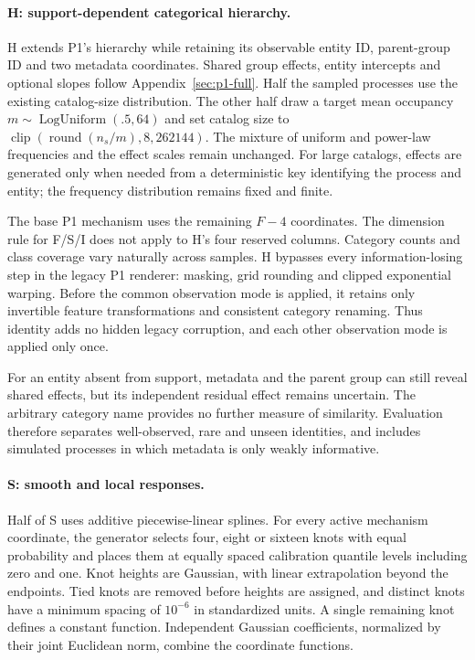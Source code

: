 \documentclass[11pt]{article}
\begin{document}
\paragraph{H: support-dependent categorical hierarchy.}
H extends P1's hierarchy while retaining its observable entity ID, parent-group ID and two metadata coordinates. Shared group effects, entity intercepts and optional slopes follow Appendix~\ref{sec:p1-full}. Half the sampled processes use the existing catalog-size distribution. The other half draw a target mean occupancy $m\sim\operatorname{LogUniform}(.5,64)$ and set catalog size to $\operatorname{clip}(\operatorname{round}(n_s/m),8,262144)$. The mixture of uniform and power-law frequencies and the effect scales remain unchanged. For large catalogs, effects are generated only when needed from a deterministic key identifying the process and entity; the frequency distribution remains fixed and finite.

The base P1 mechanism uses the remaining $F-4$ coordinates. The dimension rule for F/S/I does not apply to H's four reserved columns. Category counts and class coverage vary naturally across samples. H bypasses every information-losing step in the legacy P1 renderer: masking, grid rounding and clipped exponential warping. Before the common observation mode is applied, it retains only invertible feature transformations and consistent category renaming. Thus identity adds no hidden legacy corruption, and each other observation mode is applied only once.

For an entity absent from support, metadata and the parent group can still reveal shared effects, but its independent residual effect remains uncertain. The arbitrary category name provides no further measure of similarity. Evaluation therefore separates well-observed, rare and unseen identities, and includes simulated processes in which metadata is only weakly informative.

\paragraph{S: smooth and local responses.}
Half of S uses additive piecewise-linear splines. For every active mechanism coordinate, the generator selects four, eight or sixteen knots with equal probability and places them at equally spaced calibration quantile levels including zero and one. Knot heights are Gaussian, with linear extrapolation beyond the endpoints. Tied knots are removed before heights are assigned, and distinct knots have a minimum spacing of $10^{-6}$ in standardized units. A single remaining knot defines a constant function. Independent Gaussian coefficients, normalized by their joint Euclidean norm, combine the coordinate functions.
\end{document}
